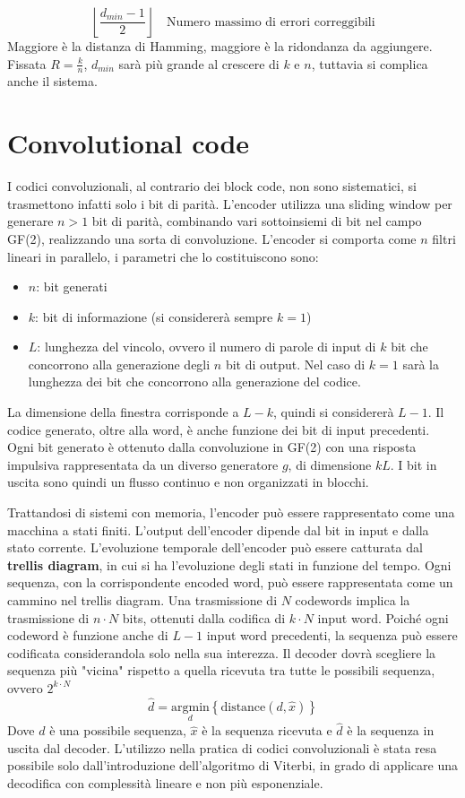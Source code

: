 \[
    \left\lfloor \frac{d_{min} - 1}{2} \right\rfloor \quad \text{Numero massimo di errori correggibili}
\]
Maggiore è la distanza di Hamming, maggiore è la ridondanza da aggiungere.
Fissata $R=\frac{k}{n}$, $d_{min}$ sarà più grande al crescere di $k$ e $n$, tuttavia si complica anche il sistema.
\section*{Convolutional code}

I codici convoluzionali, al contrario dei block code, non sono sistematici, si trasmettono infatti solo i bit di parità.
L'encoder utilizza una sliding window per generare $n>1$ bit di parità, combinando vari sottoinsiemi di bit nel campo GF(2), realizzando una sorta di convoluzione.
L'encoder si comporta come $n$ filtri lineari in parallelo, i parametri che lo costituiscono sono:
\begin{itemize}
    \item $n$: bit generati
    \item $k$: bit di informazione (si considererà sempre $k=1$)
    \item $L$: lunghezza del vincolo, ovvero il numero di parole di input di $k$ bit che concorrono alla generazione degli $n$ bit di output. Nel caso di $k=1$ sarà la lunghezza dei bit che concorrono alla generazione del codice.
\end{itemize}

La dimensione della finestra corrisponde a $L-k$, quindi si considererà $L-1$. Il codice generato, oltre alla word, è anche funzione dei bit di input precedenti. Ogni bit generato è ottenuto dalla convoluzione in GF(2) con una risposta impulsiva rappresentata da un diverso generatore $g$, di dimensione $kL$.
I bit in uscita sono quindi un flusso continuo e non organizzati in blocchi.

Trattandosi di sistemi con memoria, l'encoder può essere rappresentato come una macchina a stati finiti.
L'output dell'encoder dipende dal bit in input e dalla stato corrente.
L'evoluzione temporale dell'encoder può essere catturata dal \textbf{trellis diagram}, in cui si ha l'evoluzione degli stati in funzione del tempo.
Ogni sequenza, con la corrispondente encoded word, può essere rappresentata come un cammino nel trellis diagram.
Una trasmissione di $N$ codewords implica la trasmissione di $n \cdot N$ bits, ottenuti dalla codifica di $k \cdot N$ input word.
Poiché ogni codeword è funzione anche di $L-1$ input word precedenti, la sequenza può essere codificata considerandola solo nella sua interezza. 
Il decoder dovrà scegliere la sequenza più "vicina" rispetto a quella ricevuta tra tutte le possibili sequenza, ovvero $2^{k \cdot N}$
\[
    \hat{d} = \underset{d}{\text{argmin}} \left\{\text{distance}(d, \hat{x})\right\}
\]
Dove $d$ è una possibile sequenza, $\hat{x}$ è la sequenza ricevuta e $\hat{d}$ è la sequenza in uscita dal decoder.
L'utilizzo nella pratica di codici convoluzionali è stata resa possibile solo dall'introduzione dell'algoritmo di Viterbi, in grado di applicare una decodifica con complessità lineare e non più esponenziale.

